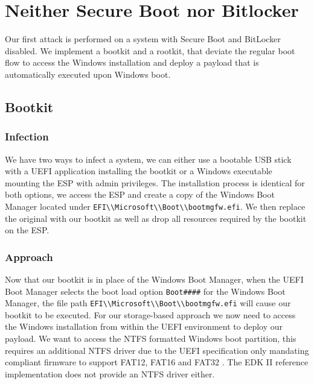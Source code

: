 
\section{Neither Secure Boot nor Bitlocker}

Our first attack is performed on a system with Secure Boot and BitLocker disabled.
We implement a bootkit and a rootkit, that deviate the regular boot flow to access the Windows installation and deploy a payload that is automatically executed upon Windows boot.

\subsection{Bootkit}

\subsubsection{Infection}


We have two ways to infect a system, we can either use a bootable USB stick with a UEFI application installing the bootkit or a Windows executable mounting the \ac{ESP} with admin privileges.
The installation process is identical for both options, we access the \ac{ESP} and create a copy of the Windows Boot Manager located under \lstinline{EFI\\Microsoft\\Boot\\bootmgfw.efi}. We then replace the original with our bootkit as well as drop all resources required by the bootkit on the \ac{ESP}.

\subsubsection{Approach}

Now that our bootkit is in place of the Windows Boot Manager, when the \ac{UEFI} Boot Manager selects the boot load option \lstinline{Boot####} for the Windows Boot Manager, the file path \lstinline{EFI\\Microsoft\\Boot\\bootmgfw.efi} will cause our bootkit to be executed.
For our storage-based approach we now need to access the Windows installation from within the \ac{UEFI} environment to deploy our payload. We want to access the \ac{NTFS} formatted Windows boot partition, this requires an additional \ac{NTFS} driver due to the \ac{UEFI} specification only mandating compliant firmware to support FAT12, FAT16 and FAT32 \cite[13.3.1.1]{uefi-spec}. The \ac{EDK} II reference implementation does not provide an \ac{NTFS} driver either.

